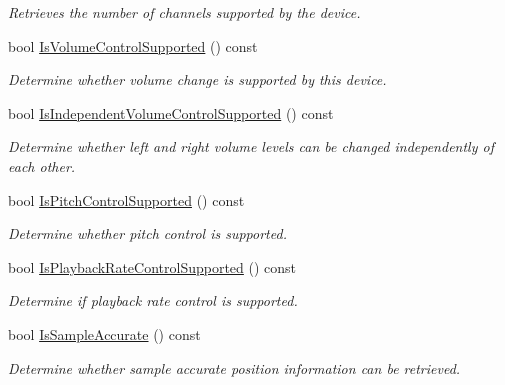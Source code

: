 \begin{DoxyCompactItemize}
\begin{DoxyCompactList}\small\item\em Retrieves the number of channels supported by the device. \item\end{DoxyCompactList}\item 
bool \hyperlink{class_sound_device_output_a623cc264f83a6f7dfe03b5bbfe670b94}{IsVolumeControlSupported} () const 
\begin{DoxyCompactList}\small\item\em Determine whether volume change is supported by this device. \item\end{DoxyCompactList}\item 
bool \hyperlink{class_sound_device_output_a47e44775f3a8604ed4a00e542c9ffbc6}{IsIndependentVolumeControlSupported} () const 
\begin{DoxyCompactList}\small\item\em Determine whether left and right volume levels can be changed independently of each other. \item\end{DoxyCompactList}\item 
bool \hyperlink{class_sound_device_output_a2c3ff147a1660fc3f8b74f5290886d97}{IsPitchControlSupported} () const 
\begin{DoxyCompactList}\small\item\em Determine whether pitch control is supported. \item\end{DoxyCompactList}\item 
bool \hyperlink{class_sound_device_output_ad600ed5ec1e72f0d50a1e4ba76785619}{IsPlaybackRateControlSupported} () const 
\begin{DoxyCompactList}\small\item\em Determine if playback rate control is supported. \item\end{DoxyCompactList}\item 
bool \hyperlink{class_sound_device_output_a0928d7ae3ce9c00cab2ba3a8dbddb0e4}{IsSampleAccurate} () const 
\begin{DoxyCompactList}\small\item\em Determine whether sample accurate position information can be retrieved. \item\end{DoxyCompactList}\end{DoxyCompactItemize}
